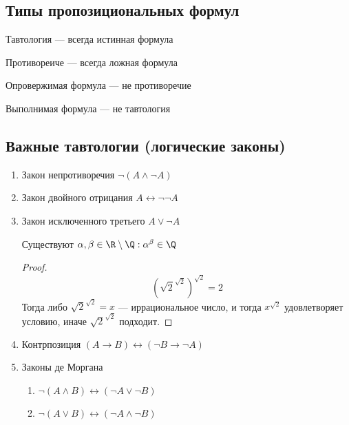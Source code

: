 
\subsection{Типы пропозициональных формул}
\begin{definition}
    Тавтология --- всегда истинная формула
\end{definition}
\begin{definition}
    Противореиче --- всегда ложная формула
\end{definition}
\begin{definition}
    Опровержимая формула --- не противоречие
\end{definition}
\begin{definition}
    Выполнимая формула --- не тавтология
\end{definition}

\subsection{Важные тавтологии (логические законы)}
\begin{enumerate}
    \item Закон непротиворечия $\neg (A \wedge \neg A)$
    \item Закон двойного отрицания $A \leftrightarrow \neg\neg A$
    \item Закон исключенного третьего $A\vee \neg A$
    \begin{theorem}
        Существуют $\alpha, \beta \in \R\setminus\Q: \alpha^\beta \in \Q$
    \end{theorem}
    \begin{proof}
        $$\left(\sqrt{2}^{\sqrt{2}}\right)^{\sqrt{2}} = 2$$
        Тогда либо $\sqrt{2}^{\sqrt{2}} = x$ --- иррациональное число, и тогда $x^{\sqrt{2}}$ удовлетворяет условию, иначе $\sqrt{2}^{\sqrt{2}}$ подходит.
    \end{proof}
    
    \item Контрпозиция $(A \rightarrow B) \leftrightarrow (\neg B \rightarrow \neg A)$
    \item Законы де Моргана 
    \begin{enumerate}
        \item $\neg(A\wedge B) \leftrightarrow (\neg A \vee \neg B)$
        \item $\neg(A\vee B) \leftrightarrow (\neg A \wedge \neg B)$
    \end{enumerate}
\end{enumerate}

